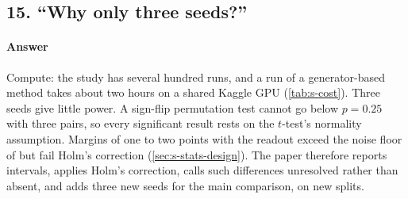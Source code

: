 \subsection*{15. ``Why only three seeds?''}

\paragraph{Answer} Compute: the study has several hundred runs, and a run of a generator-based method takes about two
hours on a shared Kaggle GPU (\cref{tab:s-cost}). Three seeds give little power. A sign-flip permutation test cannot go
below $p=0.25$ with three pairs, so every significant result rests on the $t$-test's normality assumption. Margins of
one to two points with the readout exceed the noise floor of  but fail Holm's correction
(\cref{sec:s-stats-design}). The paper therefore reports intervals, applies Holm's correction, calls such differences
unresolved rather than absent, and adds three new seeds for the main comparison, on new splits.
